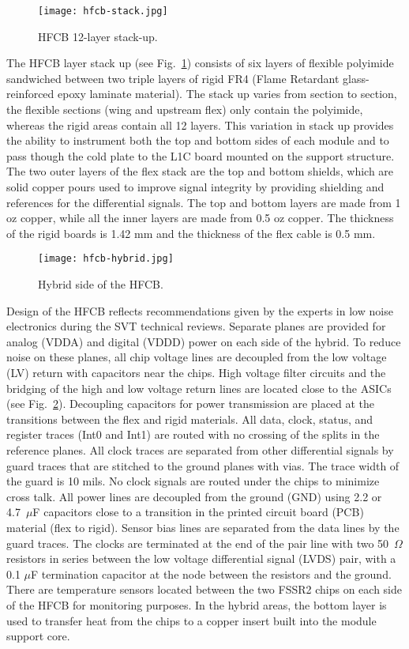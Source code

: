 \begin{figure}[hbt] 
\centering 
\texttt{[image: hfcb-stack.jpg]}
\caption{HFCB 12-layer stack-up.}
\label{fig:hfcb-stack}
\end{figure}

The HFCB layer stack up (see Fig.~\ref{fig:hfcb-stack}) consists of six layers of flexible polyimide sandwiched between two triple layers of rigid FR4 (Flame Retardant glass-reinforced epoxy laminate material). The stack up varies from section to section, the flexible sections (wing and upstream flex) only contain the polyimide, whereas the rigid areas contain all 12 layers. This variation in stack up provides the ability to instrument both the top and bottom sides of each module and to pass though the cold plate to the L1C board mounted on the support structure. The two outer layers of the flex stack are the top and bottom shields, which are solid copper pours used to improve signal integrity by providing shielding and references for the differential signals. The top and bottom layers are made from 1 oz copper, while all the inner layers are made from 0.5 oz copper. The thickness of the rigid boards is 1.42 mm and the thickness of the flex cable is 0.5 mm.

\begin{figure}[hbt] 
\centering 
\texttt{[image: hfcb-hybrid.jpg]}
\caption{Hybrid side of the HFCB.}
\label{fig:hfcb-hybrid}
\end{figure}

Design of the HFCB reflects recommendations given by the experts in low noise  electronics during the SVT technical reviews. Separate planes are provided for analog (VDDA) and digital (VDDD) power on each side of the hybrid. To reduce noise on these planes, all chip voltage lines are decoupled from the low voltage (LV) return with capacitors near the chips. High voltage filter circuits and the bridging of the high and low voltage return lines are located close to the ASICs (see Fig.~\ref{fig:hfcb-hybrid}). Decoupling capacitors for power transmission are placed at the transitions between the flex and rigid materials. All data, clock, status, and register traces (Int0 and Int1) are routed with no crossing of the splits in the reference planes. All clock traces are separated from other differential signals by guard traces that are stitched to the ground planes with vias. The trace width of the guard is 10 mils. No clock signals are routed under the chips to minimize cross talk. All power lines are  decoupled from the ground (GND) using 2.2 or 4.7~$\mu$F capacitors close to a transition in the printed circuit board (PCB) material (flex to rigid). Sensor bias lines are separated from the data lines by the guard traces. The clocks are terminated at the end of the pair line with two 50~$\Omega$ resistors in series between the low voltage differential signal (LVDS) pair, with a 0.1 $\mu$F termination capacitor at the node between the resistors and the ground. There are temperature sensors located between the two FSSR2 chips on each side of the HFCB for monitoring purposes. In the hybrid areas, the bottom layer is used to transfer heat from the chips to a copper insert built into the module support core. 

